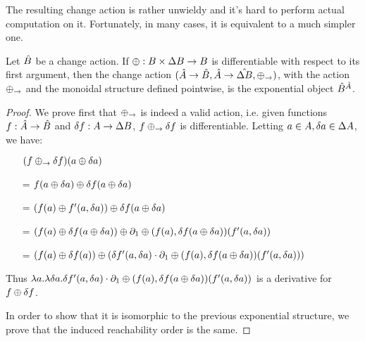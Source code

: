 The resulting change action is rather unwieldy and it's hard to perform actual computation on it. Fortunately, in many
cases, it is equivalent to a much simpler one.
\begin{lemma}
  Let $\hat{B}$ be a change action. If $\oplus : B \times \Delta B \rightarrow B$ is differentiable
  with respect to its first argument, then the change action
  $(\hat{A} \rightarrow \hat{B},\hat{A} \rightarrow \hat{\Delta B},\oplus_\rightarrow)$, with the action
  $\oplus_\rightarrow$ and the monoidal structure defined pointwise, is the exponential
  object $\hat{B}^{\hat{A}}$.
\end{lemma}
\ifproofs
\begin{proof}
  We prove first that $\oplus_\rightarrow$ is indeed a valid action, i.e. given functions $f : \hat{A} \rightarrow \hat{B}$
  and $\delta f : A \rightarrow \Delta B$, $f \oplus_\rightarrow \delta f$ is differentiable.
  Letting $a \in A, \delta a \in \Delta A$, we have:
  \begin{itemize}
    \item[ ]$(f \oplus_\rightarrow \delta f)(a \oplus \delta a)$
    \item[=]$f (a \oplus \delta a) \oplus \delta f(a \oplus \delta a)$
    \item[=]$(f (a) \oplus f'(a, \delta a)) \oplus \delta f(a \oplus \delta a)$
    \item[=]$(f (a) \oplus \delta f(a \oplus \delta a)) \oplus \partial_1\oplus(f(a), \delta f(a \oplus \delta a))(f'(a, \delta a))$
    \item[=]$(f (a) \oplus \delta f(a)) \oplus (\delta f'(a, \delta a) \cdot \partial_1\oplus(f(a), \delta f(a \oplus \delta a))(f'(a, \delta a)))$
  \end{itemize}
  Thus $\lambda a . \lambda \delta a .\delta f'(a, \delta a) \cdot \partial_1\oplus(f(a), \delta f(a \oplus \delta a))(f'(a, \delta a))$
  is a derivative for $f \oplus \delta f$.

  In order to show that it is isomorphic to the previous exponential structure, we prove that the induced
  reachability order is the same.
\end{proof}
\fi

